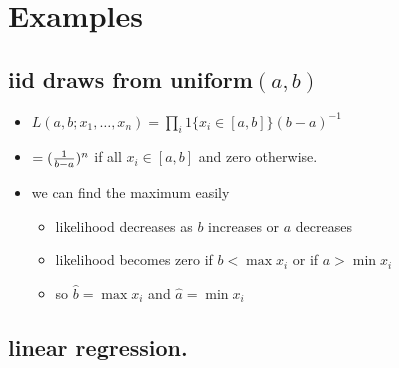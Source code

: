 \section{Examples}
\label{sec-3}
\subsection{iid draws from uniform$(a,b)$}
\label{sec-3-1}

\begin{itemize}
\item $L(a,b; x_1,\dots,x_n) = \prod_i 1\{x_i \in [a,b]\} (b-a)^{-1}$
\item $= ({1 \over b-a})^{n}$ if all $x_i \in [a,b]$ and zero otherwise.
\item we can find the maximum easily
\begin{itemize}
\item likelihood decreases as $b$ increases or $a$ decreases
\item likelihood becomes zero if $b < \max x_i$ or if $a > \min x_i$
\item so $\hat b = \max x_i$ and $\hat a = \min x_i$
\end{itemize}
\end{itemize}
\subsection{linear regression.}
\label{sec-3-2}

